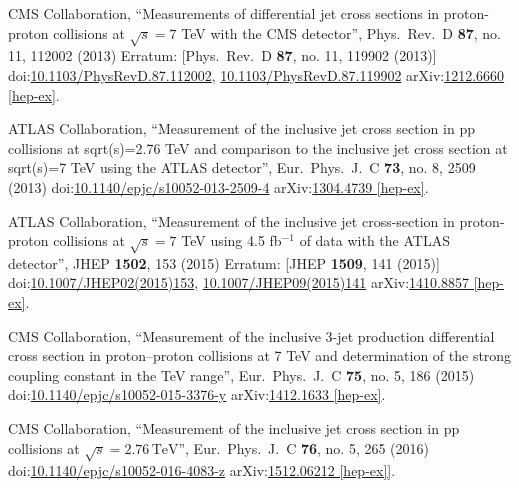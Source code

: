 \begin{thebibliography}{99}
CMS Collaboration, ``Measurements of differential jet cross sections in proton-proton collisions at $\sqrt{s}=7$ TeV with the CMS detector'', Phys.\ Rev.\ D {\bf 87}, no. 11, 112002 (2013) Erratum: [Phys.\ Rev.\ D {\bf 87}, no. 11, 119902 (2013)] doi:\href{http://dx.doi.org/10.1103/PhysRevD.87.112002}{10.1103/PhysRevD.87.112002}, \href{http://dx.doi.org/10.1103/PhysRevD.87.119902}{10.1103/PhysRevD.87.119902} arXiv:\href{https://arxiv.org/abs/1212.6660}{1212.6660 [hep-ex]}.




ATLAS Collaboration, ``Measurement of the inclusive jet cross section in pp collisions at sqrt(s)=2.76 TeV and comparison to the inclusive jet cross section at sqrt(s)=7 TeV using the ATLAS detector'', Eur.\ Phys.\ J.\ C {\bf 73}, no. 8, 2509 (2013) doi:\href{http://dx.doi.org/10.1140/epjc/s10052-013-2509-4}{10.1140/epjc/s10052-013-2509-4} arXiv:\href{https://arxiv.org/abs/1304.4739}{1304.4739 [hep-ex]}.
 
ATLAS Collaboration, ``Measurement of the inclusive jet cross-section in proton-proton collisions at $ \sqrt{s}=7 $ TeV using 4.5 fb$^{-1}$ of data with the ATLAS detector'', JHEP {\bf 1502}, 153 (2015) Erratum: [JHEP {\bf 1509}, 141 (2015)] doi:\href{http://dx.doi.org/10.1007/JHEP02(2015)153}{10.1007/JHEP02(2015)153}, \href{http://dx.doi.org/10.1007/JHEP09(2015)141}{10.1007/JHEP09(2015)141} arXiv:\href{https://arxiv.org/abs/1410.8857}{1410.8857 [hep-ex]}.

CMS Collaboration, ``Measurement of the inclusive 3-jet production differential cross section in proton–proton collisions at 7 TeV and determination of the strong coupling constant in the TeV range'', Eur.\ Phys.\ J.\ C {\bf 75}, no. 5, 186 (2015) doi:\href{http://dx.doi.org/10.1140/epjc/s10052-015-3376-y}{10.1140/epjc/s10052-015-3376-y} arXiv:\href{https://arxiv.org/abs/1412.1633}{1412.1633 [hep-ex]}.

CMS Collaboration, ``Measurement of the inclusive jet cross section in pp collisions at $\sqrt{s} = 2.76\,\text {TeV}$'', Eur.\ Phys.\ J.\ C {\bf 76}, no. 5, 265 (2016) doi:\href{http://dx.doi.org/10.1140/epjc/s10052-016-4083-z}{10.1140/epjc/s10052-016-4083-z} arXiv:\href{https://arxiv.org/abs/1512.06212}{1512.06212 [hep-ex]]}.


\end{thebibliography}
